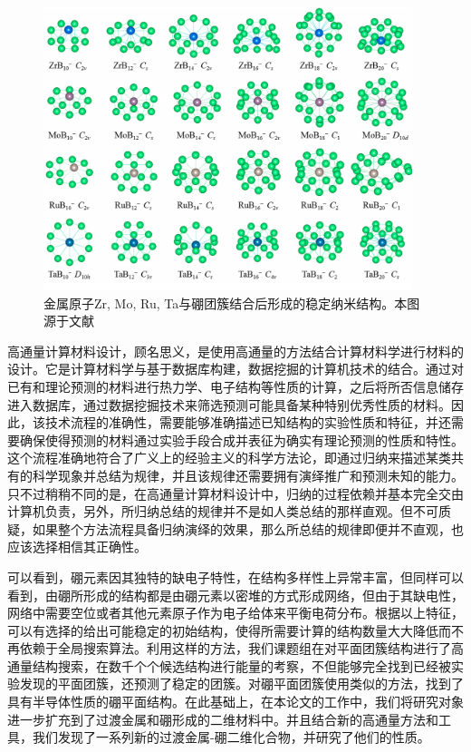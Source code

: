 \begin{figure}
  \includegraphics[width=0.96\textwidth]{figs/ch1_boron_cluster02.png}
  \centering
  \caption{金属原子Zr, Mo, Ru, Ta与硼团簇结合后形成的稳定纳米结构。本图源于文献\cite{tian2019cluster}}
  \label{fig:ch1_boron_cluster02}
\end{figure}

高通量计算材料设计，顾名思义，是使用高通量的方法结合计算材料学进行材料的设计。它是计算材料学与基于数据库构建，数据挖掘的计算机技术的结合。通过对已有和理论预测的材料进行热力学、电子结构等性质的计算，之后将所否信息储存进入数据库，通过数据挖掘技术来筛选预测可能具备某种特别优秀性质的材料。因此，该技术流程的准确性，需要能够准确描述已知结构的实验性质和特征，并还需要确保使得预测的材料通过实验手段合成并表征为确实有理论预测的性质和特性。这个流程准确地符合了广义上的经验主义的科学方法论，即通过归纳来描述某类共有的科学现象并总结为规律，并且该规律还需要拥有演绎推广和预测未知的能力。只不过稍稍不同的是，在高通量计算材料设计中，归纳的过程依赖并基本完全交由计算机负责，另外，所归纳总结的规律并不是如人类总结的那样直观。但不可质疑，如果整个方法流程具备归纳演绎的效果，那么所总结的规律即便并不直观，也应该选择相信其正确性。

可以看到，硼元素因其独特的缺电子特性，在结构多样性上异常丰富，但同样可以看到，由硼所形成的结构都是由硼元素以密堆的方式形成网络，但由于其缺电性，网络中需要空位或者其他元素原子作为电子给体来平衡电荷分布。根据以上特征，可以有选择的给出可能稳定的初始结构，使得所需要计算的结构数量大大降低而不再依赖于全局搜索算法。利用这样的方法，我们课题组在对平面团簇结构进行了高通量结构搜索，在数千个个候选结构进行能量的考察，不但能够完全找到已经被实验发现的平面团簇，还预测了稳定的团簇\cite{xu2017practical}。对硼平面团簇使用类似的方法，找到了具有半导体性质的硼平面结构\cite{xu2017two}。在此基础上，在本论文的工作中，我们将研究对象进一步扩充到了过渡金属和硼形成的二维材料中。并且结合新的高通量方法和工具，我们发现了一系列新的过渡金属-硼二维化合物，并研究了他们的性质。

